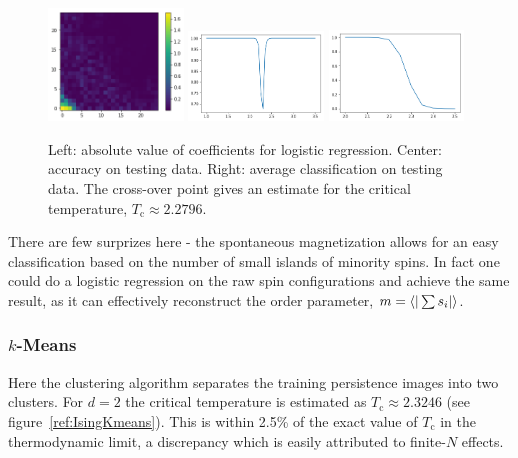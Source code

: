 \documentclass[11pt]{article}
\begin{document}
\begin{figure}[h]
    \centering
    \includegraphics[width=0.32\textwidth]{ising_images/logreg_2d_ising}
    \includegraphics[width=0.32\textwidth]{ising_images/logreg_acc_2d_ising}
    \includegraphics[width=0.32\textwidth]{ising_images/logreg_avg_2d_ising}
    \caption{Left: absolute value of coefficients for logistic regression. Center: accuracy on testing data. Right: average classification on testing data. The cross-over point gives an estimate for the critical temperature, $T_\text{c}\approx 2.2796$.}
    \label{fig:IsingLogReg}
\end{figure}

There are few surprizes here - the spontaneous magnetization allows for an easy classification based on the number of small islands of minority spins. In fact one could do a logistic regression on the raw spin configurations and achieve the same result, as it can effectively reconstruct the order parameter, $m=\ev{|\sum s_i|}$.

\subsubsection{$k$-Means}
Here the clustering algorithm separates the training persistence images into two clusters. For $d=2$ the critical temperature is estimated as $T_\text{c}\approx 2.3246$ (see figure~\ref{ref:IsingKmeans}). This is within 2.5\% of the exact value of $T_\text{c}$ in the thermodynamic limit, a discrepancy which is easily attributed to finite-$N$ effects.
\end{document}
